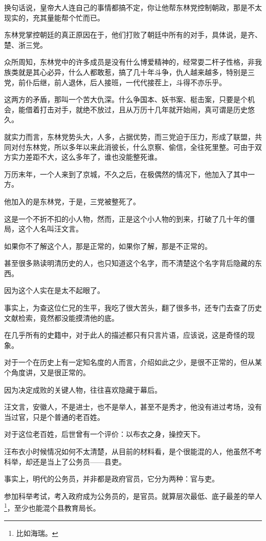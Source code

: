 \begin{multicols}{\theparacolNo}
		换句话说，皇帝大人连自己的事情都搞不定，你让他帮东林党控制朝政，那是不太现实的，充其量能帮个忙而已。

		东林党掌控朝廷的真正原因在于，他们打败了朝廷中所有的对手，具体说，是齐、楚、浙三党。

		众所周知，东林党中的许多成员是没有什么博爱精神的，经常耍二杆子性格，非我族类就是其心必异，什么人都敢惹，搞了几十年斗争，仇人越来越多，特别是三党，前仆后继，前人退休，后人接班，一代代接茬上，斗得不亦乐乎。

		这两方的矛盾，那叫一个苦大仇深。什么争国本、妖书案、梃击案，只要是个机会，能借着打击对手，就绝不放过，且从万历十几年就开始闹，真可谓是历史悠久。

		就实力而言，东林党势头大，人多，占据优势，而三党迫于压力，形成了联盟，共同对付东林党，所以多年以来此消彼长，什么京察、偷信，全往死里整。可由于双方实力差距不大，这么多年了，谁也没能整死谁。

		万历末年，一个人来到了京城，不久之后，在极偶然的情况下，他加入了其中一方。

		他加入的是东林党，于是，三党被整死了。

		这是一个不折不扣的小人物，然而，正是这个小人物的到来，打破了几十年的僵局，这个人名叫汪文言。

		如果你不了解这个人，那是正常的，如果你了解，那是不正常的。

		甚至很多熟读明清历史的人，也只知道这个名字，而不清楚这个名字背后隐藏的东西。

		因为这个人实在是太不起眼了。

		事实上，为查这位仁兄的生平，我吃了很大苦头，翻了很多书，还专门去查了历史文献检索，竟然都没能摸清他的底。

		在几乎所有的史籍中，对于此人的描述都只有只言片语，应该说，这是奇怪的现象。

		对于一个在历史上有一定知名度的人而言，介绍如此之少，是很不正常的，但从某个角度讲，又是很正常的。

		因为决定成败的关键人物，往往喜欢隐藏于幕后。

		汪文言，安徽人，不是进士，也不是举人，甚至不是秀才，他没有进过考场，没有当过官，只是个普通的老百姓。

		对于这位老百姓，后世曾有一个评价：以布衣之身，操控天下。

		汪布衣小时候情况如何不太清楚，从目前的材料看，是个很能混的人，他虽然不考科举，却还是当上了公务员——县吏。

		事实上，明代的公务员，并非都是政府官员，它分为两种：官与吏。

		参加科举考试，考入政府成为公务员的，是官员。就算层次最低、底子最差的举人\footnote{比如海瑞。}，至少也能混个县教育局长。


\end{multicols}
